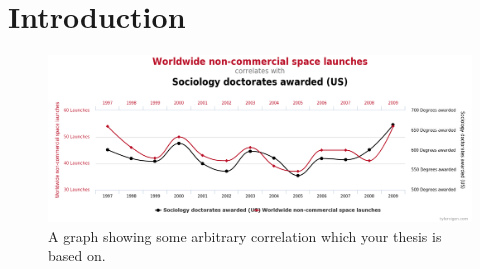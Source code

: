 \chapter{Introduction}

\lipsum[3-4]

\begin{figure}
    \centering
    \includegraphics[width=\linewidth]{chapter1/figures/example_graph.png}
    \caption{A graph showing some arbitrary correlation which your thesis is based on.}
\end{figure}

\lipsum[5-6]
